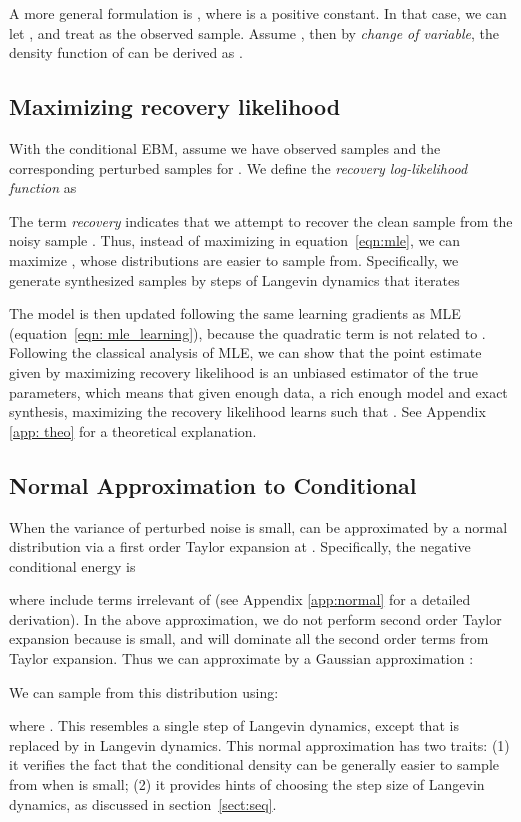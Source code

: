 \documentclass{article} \usepackage{iclr2021_conference,times}
\def\secref#1{section~\ref{#1}}
\def\eqref#1{equation~\ref{#1}}
\begin{document}
A more general formulation is , where  is a positive constant. In that case, we can let , and treat  as the observed sample. Assume , then by \emph{change of variable}, the density function of  can be derived as .

\subsection{Maximizing recovery likelihood} \label{sect: learning}
With the conditional EBM, assume we have observed samples  and the corresponding perturbed samples  for . We define the \emph{recovery log-likelihood function} as

The term \emph{recovery} indicates that we attempt to recover the clean sample  from the noisy sample . Thus, instead of maximizing  in \eqref{eqn:mle}, we can maximize , whose distributions are easier to sample from. Specifically, we generate synthesized samples by  steps of Langevin dynamics that iterates

The model is then updated following the same learning gradients as MLE (\eqref{eqn: mle_learning}), because the quadratic term  is not related to . Following the classical analysis of MLE, we can show that the point estimate given by maximizing recovery likelihood is an unbiased estimator of the true parameters, which means that given enough data, a rich enough model and exact synthesis, maximizing the recovery likelihood learns  such that . See Appendix \ref{app: theo} for a theoretical explanation.

\subsection{Normal Approximation to Conditional}
When the variance of perturbed noise  is small,  can be approximated by a normal distribution via a first order Taylor expansion at . Specifically, the negative conditional energy is 

where  include terms irrelevant of  (see Appendix \ref{app:normal} for a detailed derivation). In the above approximation, we do not perform second order Taylor expansion because  is small, and  will dominate all the second order terms from Taylor expansion. 
Thus we can approximate  by a Gaussian approximation :

We can sample from this distribution using: 
 
where . This resembles a single step of Langevin dynamics, except that  is replaced by  in Langevin dynamics. This normal approximation has two traits: (1) it verifies the fact that the conditional density  can be generally easier to sample from when  is small; (2) it provides hints of choosing the step size of Langevin dynamics, as discussed in \secref{sect:seq}.
\end{document}
